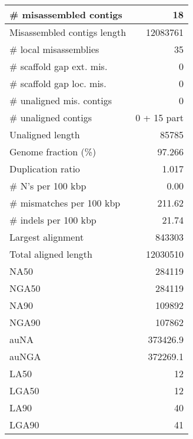 \documentclass[12pt,a4paper]{article}
\begin{document}
\begin{table}[ht]
\begin{center}
\begin{tabular}{|l*{1}{|r}|}
\# misassembled contigs & 18 \\ \hline
Misassembled contigs length & 12083761 \\ \hline
\# local misassemblies & 35 \\ \hline
\# scaffold gap ext. mis. & 0 \\ \hline
\# scaffold gap loc. mis. & 0 \\ \hline
\# unaligned mis. contigs & 0 \\ \hline
\# unaligned contigs & 0 + 15 part \\ \hline
Unaligned length & 85785 \\ \hline
Genome fraction (\%) & 97.266 \\ \hline
Duplication ratio & 1.017 \\ \hline
\# N's per 100 kbp & 0.00 \\ \hline
\# mismatches per 100 kbp & 211.62 \\ \hline
\# indels per 100 kbp & 21.74 \\ \hline
Largest alignment & 843303 \\ \hline
Total aligned length & 12030510 \\ \hline
NA50 & 284119 \\ \hline
NGA50 & 284119 \\ \hline
NA90 & 109892 \\ \hline
NGA90 & 107862 \\ \hline
auNA & 373426.9 \\ \hline
auNGA & 372269.1 \\ \hline
LA50 & 12 \\ \hline
LGA50 & 12 \\ \hline
LA90 & 40 \\ \hline
LGA90 & 41 \\ \hline
\end{tabular}
\end{center}
\end{table}
\end{document}
